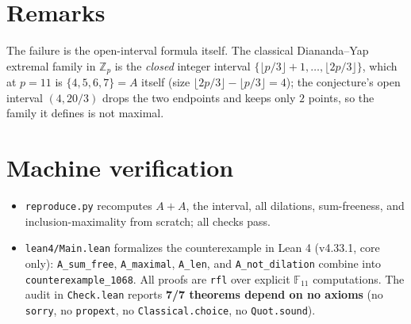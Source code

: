 \documentclass[11pt]{article}
\newcommand{\F}{\mathbb{F}}
\begin{document}
\section{Remarks}

The failure is the open-interval formula itself. The classical Diananda--Yap extremal family in $\mathbb{Z}_p$ is the \emph{closed} integer interval
$\{\lfloor p/3\rfloor + 1, \dots, \lfloor 2p/3 \rfloor\}$,
which at $p=11$ is $\{4,5,6,7\} = A$ itself (size $\lfloor 2p/3\rfloor - \lfloor p/3\rfloor = 4$); the conjecture's open interval $(4, 20/3)$ drops the two endpoints and keeps only $2$ points, so the family it defines is not maximal.

\section{Machine verification}

\begin{itemize}
\item \texttt{reproduce.py} recomputes $A+A$, the interval, all dilations, sum-freeness, and inclusion-maximality from scratch; all checks pass.
\item \texttt{lean4/Main.lean} formalizes the counterexample in Lean 4 (v4.33.1, core only): \texttt{A\_sum\_free}, \texttt{A\_maximal}, \texttt{A\_len}, and \texttt{A\_not\_dilation} combine into \texttt{counterexample\_1068}. All proofs are \texttt{rfl} over explicit $\F_{11}$ computations. The audit in \texttt{Check.lean} reports \textbf{7/7 theorems depend on no axioms} (no \texttt{sorry}, no \texttt{propext}, no \texttt{Classical.choice}, no \texttt{Quot.sound}).
\end{itemize}
\end{document}

